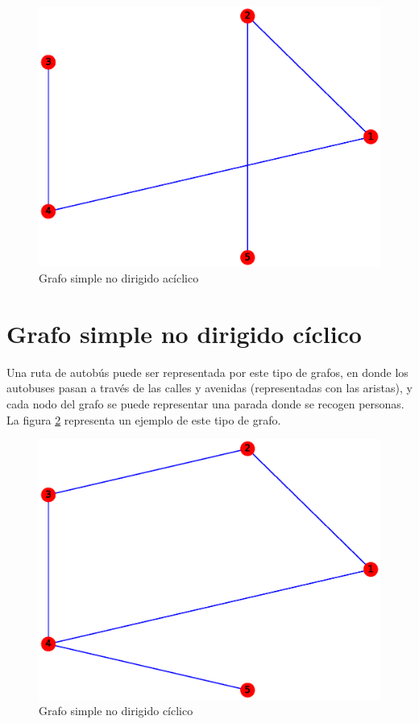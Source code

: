 \documentclass{article}
\begin{document}
\begin{figure}[H]
    \includegraphics[width=\textwidth]{1-GSNDA}
    \caption{Grafo simple no dirigido acíclico}
    \label{fig:GSNDA}
\end{figure}





\section{Grafo simple no dirigido cíclico}
Una ruta de autobús puede ser representada por este tipo de grafos, en donde los autobuses pasan a través de las calles y avenidas (representadas con las aristas), y cada nodo del grafo se puede representar una parada donde se recogen personas. La figura \ref{fig:GSNDC} representa un ejemplo de este tipo de grafo.
\begin{figure}[H]
    \includegraphics[width=\textwidth]{2-GSNDC}
    \caption{Grafo simple no dirigido cíclico}
    \label{fig:GSNDC}
\end{figure}
\end{document}
